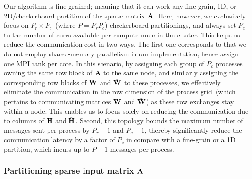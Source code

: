 Our algorithm is fine-grained; meaning that it can work any fine-grain, 1D, or 2D/checkerboard partition of the sparse matrix $\mathbf{A}$.
Here, however, we exclusively focus on $P_r \times P_c$~(where $P = P_r P_c$) checkerboard partitionings, and always set $P_c$ to the number of cores available per compute node in the cluster.
This helps us reduce the communication cost in two ways.
The first one corresponds to that we do not employ shared-memory parallelism in our implementation, hence assign one MPI rank per core.
In this scenario, by assigning each group of $P_c$ processes owning the same row block of $\mathbf{A}$ to the same node, and similarly assigning the corresponding row blocks of $\mathbf{W}$ and $\mathbf{\tilde{W}}$ to these processes, we effectively eliminate the communication in the row dimension of the process grid~(which pertains to communicating matrices $\mathbf{W}$ and $\mathbf{\tilde{W}}$) as these row exchanges stay within a node.
This enables us to focus solely on reducing the communication due to columns of $\mathbf{H}$ and $\mathbf{\tilde{H}}$.
Second, this topology bounds the maximum number of messages sent per process by $P_r-1$ and $P_c-1$, thereby significantly reduce the communication latency by a factor of $P_c$ in compare with a fine-grain or a 1D partition, which incurs up to $P-1$ messages per process.

\subsubsection{Partitioning sparse input matrix $\mathbf{A}$} \label{sec:cp1d}

